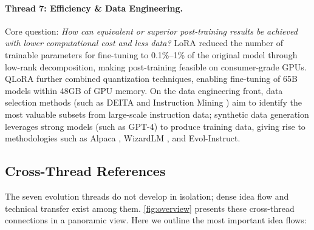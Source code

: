 \paragraph{Thread 7: Efficiency \& Data Engineering.}
Core question: \textit{How can equivalent or superior post-training results be achieved with lower computational cost and less data?}
LoRA \cite{hu2022lora} reduced the number of trainable parameters for fine-tuning to 0.1\%--1\% of the original model through low-rank decomposition,
making post-training feasible on consumer-grade GPUs.
QLoRA \cite{dettmers2023qlora} further combined quantization techniques,
enabling fine-tuning of 65B models within 48GB of GPU memory.
On the data engineering front,
data selection methods (such as DEITA \cite{liu2024deita}
and Instruction Mining \cite{cao2024instructionmining}) aim to identify the most valuable subsets from large-scale instruction data;
synthetic data generation leverages strong models (such as GPT-4) to produce training data,
giving rise to methodologies such as Alpaca \cite{taori2023alpaca},
WizardLM \cite{xu2024wizardlm},
and Evol-Instruct.

\subsection{Cross-Thread References}
\label{sec:t0-crossref}

The seven evolution threads do not develop in isolation; dense idea flow and technical transfer exist among them.
\cref{fig:overview} presents these cross-thread connections in a panoramic view.
Here we outline the most important idea flows:

